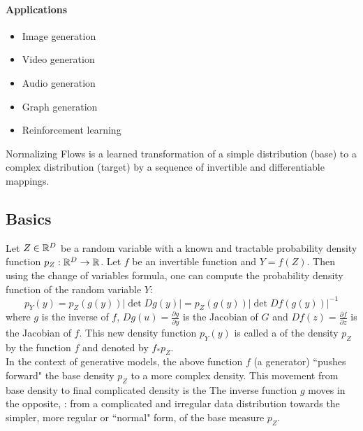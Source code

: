 \documentclass[11pt]{article}
\begin{document}
\paragraph{Applications}
\begin{itemize}
	\item Image generation
	\item Video generation
	\item Audio generation
	\item Graph generation
	\item Reinforcement learning
\end{itemize}

Normalizing Flows is a learned transformation of a simple distribution (base) to a complex distribution (target) by a sequence of invertible and differentiable mappings.

\subsection{Basics}
Let $Z \in \mathbb{R}^D$ be a random variable with a known and tractable probability density function $p_Z:\mathbb{R}^D \rightarrow \mathbb{R}$. Let $f$ be an invertible function and $Y = f(Z)$. 
Then using the change of variables formula, one can compute the probability density function of the random variable $Y$:
\begin{equation}\label{eq1}
	p_Y(y) = p_Z(g(y))|\det Dg(y)| = p_Z(g(y))|\det Df(g(y))|^{-1}
\end{equation}
where $g$ is the inverse of $f$, $Dg(u) = \frac{\partial g}{\partial y}$ is the Jacobian of $G$ and $Df(z) = \frac{\partial f}{\partial z}$ is the Jacobian of $f$. This new density function $p_Y(y)$ is called a  of the density $p_Z$ by the function $f$ and denoted by $f_{\ast}p_Z$.\\
In the context of generative models, the above function $f$ (a generator) ``pushes forward" the base density $p_Z$ to a more complex density. This movement from base density to final complicated density is the 
\remark
{}
The inverse function $g$ moves in the opposite, : from a complicated and irregular data distribution towards the simpler, more regular or ``normal" form, of the base measure $p_Z$.
\end{document}
